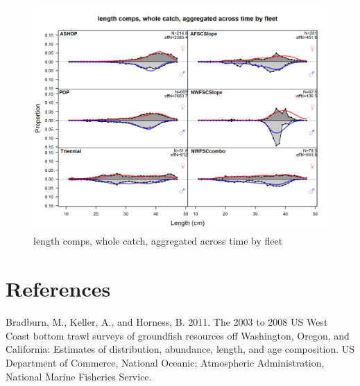 \documentclass[12pt,]{article}
\begin{document}
\begin{figure}
\centering
\includegraphics{./r4ss/plots_mod1/comp_lenfit_mkt0_aggregated_across_time.png}
\caption{length comps, whole catch, aggregated across time by fleet
\label{fig:mod1_36_comp_lenfit_mkt0_aggregated_across_time}}
\end{figure}

\FloatBarrier

\FloatBarrier

\FloatBarrier

\FloatBarrier

\FloatBarrier

\FloatBarrier

\FloatBarrier

\FloatBarrier

\newpage

\color{black}

\section*{References}\label{references}

\renewcommand{\thepage}{}

\hypertarget{refs}{}
\hypertarget{ref-bradburn_2003_2011}{}
Bradburn, M., Keller, A., and Horness, B. 2011. The 2003 to 2008 US West
Coast bottom trawl surveys of groundfish resources off Washington,
Oregon, and California: Estimates of distribution, abundance, length,
and age composition. US Department of Commerce, National Oceanic;
Atmospheric Administration, National Marine Fisheries Service.
\end{document}
